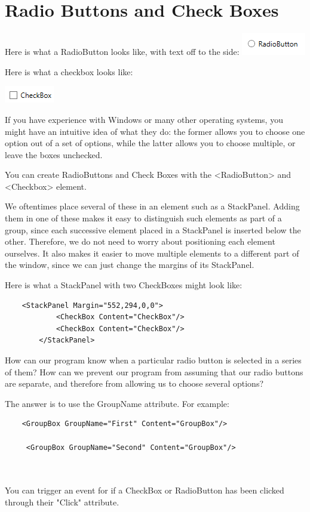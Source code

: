 \documentclass[oneside, openany] {book}
\begin{document}
\section{Radio Buttons and Check Boxes}
Here is what a RadioButton looks like, with text off to the side:
\includegraphics{radiobutton}

Here is what a checkbox looks like:


\includegraphics{checkbox}


If you have experience with Windows or many other operating systems, you might have an intuitive idea of what they do: the former allows you to choose one option out of a set of options, while the latter allows you to choose multiple, or leave the boxes unchecked.

You can create RadioButtons and Check Boxes with the <RadioButton> and <Checkbox> element.

We oftentimes place several of these in an element such as a StackPanel. Adding them in one of these makes it easy to distinguish such elements as part of a group, since each successive element placed in a StackPanel is inserted below the other. Therefore, we do not need to worry about positioning each element ourselves. It also makes it easier to move multiple elements to a different part of the window, since we can just change the margins of its StackPanel.

Here is what a StackPanel with two CheckBoxes might look like:
\begin{verbatim}
    <StackPanel Margin="552,294,0,0">
            <CheckBox Content="CheckBox"/>
            <CheckBox Content="CheckBox"/>
        </StackPanel>
\end{verbatim}
How can our program know when a particular radio button is selected in a series of them? How can we prevent our program from assuming that our radio buttons are separate, and therefore from allowing us to choose several options?

The answer is to use the GroupName attribute. For example:

\begin{verbatim}
    <GroupBox GroupName="First" Content="GroupBox"/>
    
     <GroupBox GroupName="Second" Content="GroupBox"/>
    
        
\end{verbatim}
You can trigger an event for if a CheckBox or RadioButton has been clicked through their "Click" attribute.
\end{document}
